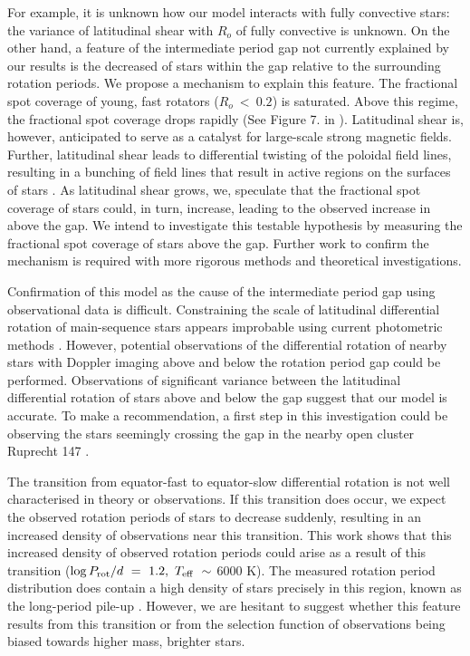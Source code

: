 For example, it is unknown how our model interacts with fully convective stars: the variance of latitudinal shear with $R_o$ of fully convective is unknown.
On the other hand, a feature of the intermediate period gap not currently explained by our results is the decreased \rper{} of stars within the gap relative to the surrounding rotation periods.
We propose a mechanism to explain this feature.
The fractional spot coverage of young, fast rotators ($R_o \ < \ 0.2$) is saturated.
Above this regime, the fractional spot coverage drops rapidly (See Figure 7. in \citet{cao_starspots_2022}).
Latitudinal shear is, however, anticipated to serve as a catalyst for large-scale strong magnetic fields.
Further, latitudinal shear leads to differential twisting of the poloidal field lines, resulting in a bunching of field lines that result in active regions on the surfaces of stars \citep[see, e.g.,][]{berdyugina_starspots_2005, miesch_large-scale_2005, magnetism_brun_2017}.
As latitudinal shear grows, we, speculate that the fractional spot coverage of stars could, in turn, increase, leading to the observed increase in \rper{} above the gap.
We intend to investigate this testable hypothesis by measuring the fractional spot coverage of stars above the gap.
Further work to confirm the mechanism is required with more rigorous methods and theoretical investigations.

Confirmation of this model as the cause of the intermediate period gap using observational data is difficult.
Constraining the scale of latitudinal differential rotation of main-sequence stars appears improbable using current photometric methods \citep[see Section 4.3 of][]{aigrain_hare_2015}.
However, potential observations of the differential rotation of nearby stars with Doppler imaging above and below the rotation period gap could be performed.
Observations of significant variance between the latitudinal differential rotation of stars above and below the gap suggest that our model is accurate.
To make a recommendation, a first step in this investigation could be observing the stars seemingly crossing the gap in the nearby open cluster Ruprecht 147 \citep{curtis_when_2020}.

The transition from equator-fast to equator-slow differential rotation is not well characterised in theory or observations.
If this transition does occur, we expect the observed rotation periods of stars to decrease suddenly, resulting in an increased density of observations near this transition.
This work shows that this increased density of observed rotation periods could arise as a result of this transition ($\log P_{\rm{rot}}/d \ = \ 1.2, \ T_{\rm{eff}} \ \sim $ 6000 K).
The measured \kepler{} rotation period distribution does contain a high density of stars precisely in this region, known as the long-period pile-up \citep{van_saders_forward_2019}.
However, we are hesitant to suggest whether this feature results from this transition or from the selection function of \kepler{} observations being biased towards higher mass, brighter stars.

